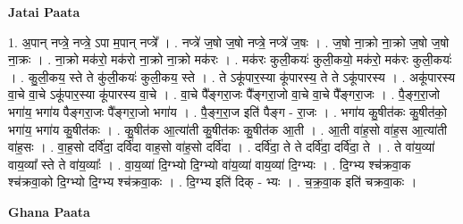 \documentclass[17pt]{extarticle}
\begin{document}
\textbf{Jatai Paata} \newline

1. अ॒पान् नप्त्रे॒ नप्त्रे॒ ऽपा म॒पान् नप्त्रे᳚ । . नप्त्रे॑ ज॒षो ज॒षो नप्त्रे॒ नप्त्रे॑ ज॒षः । . ज॒षो ना॒क्रो ना॒क्रो ज॒षो ज॒षो ना॒क्रः । . ना॒क्रो मक॑रो॒ मक॑रो ना॒क्रो ना॒क्रो मक॑रः । . मक॑रः कुली॒कयः॑ कुली॒कयो॒ मक॑रो॒ मक॑रः कुली॒कयः॑ । . कु॒ली॒कय॒ स्ते ते कु॑ली॒कयः॑ कुली॒कय॒ स्ते । . ते ऽकू॑पार॒स्या कू॑पारस्य॒ ते ते ऽकू॑पारस्य । . अकू॑पारस्य वा॒चे वा॒चे ऽकू॑पार॒स्या कू॑पारस्य वा॒चे । . वा॒चे पै᳚ङ्गरा॒जः पै᳚ङ्गरा॒जो वा॒चे वा॒चे पै᳚ङ्गरा॒जः । . पै॒ङ्ग॒रा॒जो भगा॑य॒ भगा॑य पैङ्गरा॒जः पै᳚ङ्गरा॒जो भगा॑य । . पै॒ङ्ग॒रा॒ज इति॑ पैङ्ग - रा॒जः । . भगा॑य कु॒षीत॑कः कु॒षीत॑को॒ भगा॑य॒ भगा॑य कु॒षीत॑कः । . कु॒षीत॑क आ॒त्या॑ती कु॒षीत॑कः कु॒षीत॑क आ॒ती । . आ॒ती वा॑ह॒सो वा॑ह॒स आ॒त्या॑ती वा॑ह॒सः । . वा॒ह॒सो दर्वि॑दा॒ दर्वि॑दा वाह॒सो वा॑ह॒सो दर्वि॑दा । . दर्वि॑दा॒ ते ते दर्वि॑दा॒ दर्वि॑दा॒ ते । . ते वा॑य॒व्या॑ वाय॒व्या᳚ स्ते ते वा॑य॒व्याः᳚ । . वा॒य॒व्या॑ दि॒ग्भ्यो दि॒ग्भ्यो वा॑य॒व्या॑ वाय॒व्या॑ दि॒ग्भ्यः । . दि॒ग्भ्य श्च॑क्रवा॒क श्च॑क्रवा॒को दि॒ग्भ्यो दि॒ग्भ्य श्च॑क्रवा॒कः । . दि॒ग्भ्य इति॑ दिक् - भ्यः । . च॒क्र॒वा॒क इति॑ चक्रवा॒कः । \newline

\textbf{Ghana Paata } \newline
\end{document}
